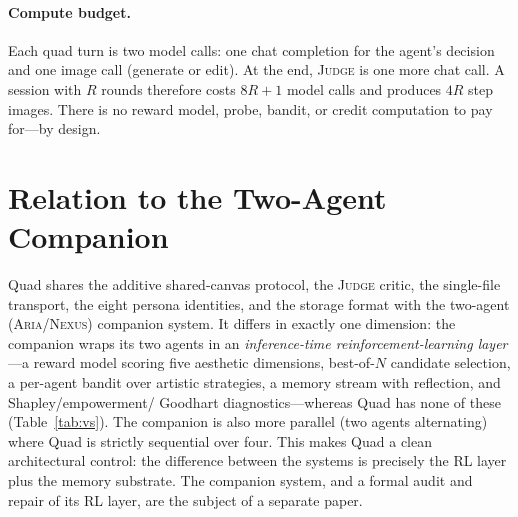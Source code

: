 \documentclass[11pt]{article}
\newcommand{\JUDGE}{\textsc{Judge}}
\begin{document}
\paragraph{Compute budget.}
Each quad turn is two model calls: one chat completion for the agent's decision and
one image call (generate or edit). At the end, \JUDGE{} is one more chat call. A
session with $R$ rounds therefore costs $8R + 1$ model calls and produces $4R$
step images. There is no reward model, probe, bandit, or credit computation to pay
for---by design.

\section{Relation to the Two-Agent Companion}
\label{sec:relation}
Quad shares the additive shared-canvas protocol, the \JUDGE{} critic, the
single-file transport, the eight persona identities, and the storage format with
the two-agent (\textsc{Aria}/\textsc{Nexus}) companion system. It differs in
exactly one dimension: the companion wraps its two agents in an
\emph{inference-time reinforcement-learning layer}---a reward model scoring five
aesthetic dimensions, best-of-$N$ candidate selection, a per-agent bandit over
artistic strategies, a memory stream with reflection, and Shapley/empowerment/%
Goodhart diagnostics---whereas Quad has none of these (Table~\ref{tab:vs}). The
companion is also more parallel (two agents alternating) where Quad is strictly
sequential over four. This makes Quad a clean architectural control: the
difference between the systems is precisely the RL layer plus the memory
substrate. The companion system, and a formal audit and repair of its RL layer,
are the subject of a separate paper.
\end{document}
